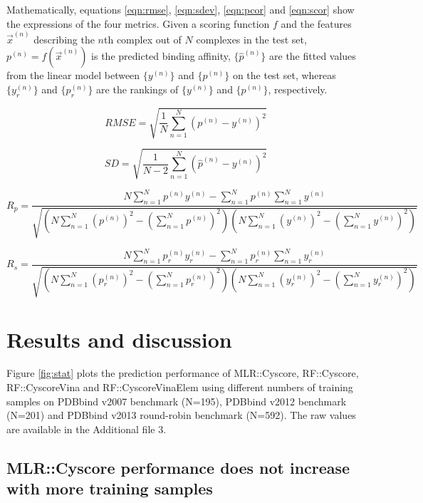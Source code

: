 \documentclass[twocolumn]{bmcart}
\begin{document}
Mathematically, equations \ref{eqn:rmse}, \ref{eqn:sdev}, \ref{eqn:pcor} and \ref{eqn:scor} show the expressions of the four metrics. Given a scoring function $f$ and the features $\overrightarrow{x}^{(n)}$ describing the $n$th complex out of $N$ complexes in the test set, $p^{(n)}=f(\overrightarrow{x}^{(n)})$ is the predicted binding affinity, $\{\hat{p}^{(n)}\}$ are the fitted values from the linear model between $\{y^{(n)}\}$ and $\{p^{(n)}\}$ on the test set, whereas $\{y_r^{(n)}\}$ and $\{p_r^{(n)}\}$ are the rankings of $\{y^{(n)}\}$ and $\{p^{(n)}\}$, respectively.

\begin{equation}
RMSE = \sqrt{\frac{1}{N}\sum_{n=1}^N(p^{(n)}-y^{(n)})^2}
\label{eqn:rmse}
\end{equation}

\begin{equation}
SD = \sqrt{\frac{1}{N-2}\sum_{n=1}^N(\hat{p}^{(n)}-y^{(n)})^2}
\label{eqn:sdev}
\end{equation}

\begin{equation}
R_p = \frac{N\sum_{n=1}^Np^{(n)}y^{(n)}-\sum_{n=1}^Np^{(n)}\sum_{n=1}^Ny^{(n)}}{\sqrt{(N\sum_{n=1}^N(p^{(n)})^2-(\sum_{n=1}^Np^{(n)})^2)(N\sum_{n=1}^N(y^{(n)})^2-(\sum_{n=1}^Ny^{(n)})^2)}}
\label{eqn:pcor}
\end{equation}

\begin{equation}
R_s = \frac{N\sum_{n=1}^Np_r^{(n)}y_r^{(n)}-\sum_{n=1}^Np_r^{(n)}\sum_{n=1}^Ny_r^{(n)}}{\sqrt{(N\sum_{n=1}^N(p_r^{(n)})^2-(\sum_{n=1}^Np_r^{(n)})^2)(N\sum_{n=1}^N(y_r^{(n)})^2-(\sum_{n=1}^Ny_r^{(n)})^2)}}
\label{eqn:scor}
\end{equation}

\section*{Results and discussion}

Figure \ref{fig:stat} plots the prediction performance of MLR::Cyscore, RF::Cyscore, RF::CyscoreVina and RF::CyscoreVinaElem using different numbers of training samples on PDBbind v2007 benchmark (N=195), PDBbind v2012 benchmark (N=201) and PDBbind v2013 round-robin benchmark (N=592). The raw values are available in the Additional file 3.

\subsection*{MLR::Cyscore performance does not increase with more training samples}
\end{document}
